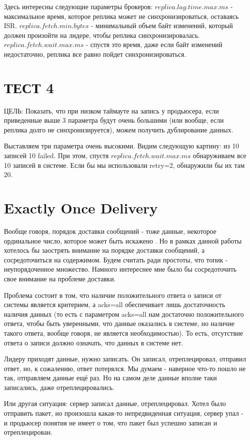 \documentclass[11pt]{article}
\begin{document}
    Здесь интересны следующие параметры брокеров:
    $replica.lag.time.max.ms$ - максимальное время, которое реплика может не синхронизироваться, оставаясь ISR.
    $replica.fetch.min.bytes$ - минимальный объем байт изменений, который должен произойти на лидере, чтобы реплика
    синхронизировалась.
    $replica.fetch.wait.max.ms$ - спустя это время, даже если байт изменений недостаточно, реплика все равно пойдет
    синхронизироваться.
    \section{ТЕСТ 4}
    ЦЕЛЬ: Показать, что при низком таймауте на запись у продьюсера, если приведенные выше 3 параметра будут очень
    большими (или вообще, если реплика долго не синхронизируется), можем получить дублирование данных.

    Выставляем три параметра очень высокими. Видим следующую картину: из 10 записей 10 failed. При этом, спустя
    $replica.fetch.wait.max.ms$ обнаруживаем все 10 записей в системе. Если бы мы использовали retry=2, обнаружили бы
    их там 20.

    \section{Exactly Once Delivery}
    Вообще говоря, порядок доставки сообщений - тоже данные, некоторое ординальное число, которое может быть искажено
    . Но в рамках данной работы хотелось бы заострять внимание на порядке доставки сообщений, а сосредоточиться на
    содержимом. Будем считать ради простоты, что топик - неупорядоченное множество. Намного интереснее мне было бы сосредоточить свое внимание на проблеме доставки.

    Проблема состоит в том, что наличие положительного ответа о записи от системы является критерием, а acks=all обеспечивает лишь достаточность наличия данных (то есть с параметром acks=all нам достаточно положительного ответа, чтобы быть уверенными, что данные оказались в системе, но наличие такого ответа, вообще говоря, не является необходимостью). То есть, отсутствие ответа о записи должно означать, что данных в системе нет.

    Лидеру приходят данные, нужно записать. Он записал, отреплецировал, отправил ответ, но, к сожалению, ответ потерялся. Мы думаем - наверное что-то пошло не так, отправляем данные ещё раз. Но на самом деле данные вполне таки записались, даже отреплецировались.

    Или другая ситуация: сервер записал данные, отреплецировал. Хотел было отправить пакет, но произошла какая-то непредвиденная ситуация, сервер упал - и продьюсер понятия не имеет о том, что пакет был успешно записан и отреплецирован.
\end{document}
